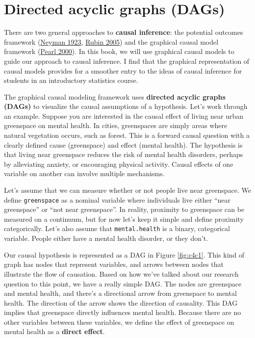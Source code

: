 \documentclass[
]{book}
\begin{document}
\section{Directed acyclic graphs (DAGs)}\label{directed-acyclic-graphs-dags}

There are two general approaches to \textbf{causal inference}: the potential outcomes framework (\href{https://www.jstor.org/stable/2245382}{Neyman 1923}, \href{https://www.jstor.org/stable/27590541}{Rubin 2005}) and the graphical causal model framework (\href{https://bayes.cs.ucla.edu/BOOK-2K/}{Pearl 2000}). In this book, we will use graphical causal models to guide our approach to causal inference. I find that the graphical representation of causal models provides for a smoother entry to the ideas of causal inference for students in an introductory statistics course.

The graphical causal modeling framework uses \textbf{directed acyclic graphs (DAGs)} to visualize the causal assumptions of a hypothesis. Let's work through an example. Suppose you are interested in the causal effect of living near urban greenspace on mental health. In cities, greenspaces are simply areas where natural vegetation occurs, such as forest. This is a forward causal question with a clearly defined cause (greenspace) and effect (mental health). The hypothesis is that living near greenspace reduces the risk of mental health disorders, perhaps by alleviating anxiety, or encouraging physical activity. Causal effects of one variable on another can involve multiple mechanisms.

Let's assume that we can measure whether or not people live near greenspace. We define \texttt{greenspace} as a nominal variable where individuals live either ``near greenspace'' or ``not near greenspace''. In reality, proximity to greenspace can be measured on a continuum, but for now let's keep it simple and define proximity categorically. Let's also assume that \texttt{mental.health} is a binary, categorical variable. People either have a mental health disorder, or they don't.

Our causal hypothesis is represented as a DAG in Figure \ref{fig:c4c1}. This kind of graph has nodes that represent variables, and arrows between nodes that illustrate the flow of causation. Based on how we've talked about our research question to this point, we have a really simple DAG. The nodes are greenspace and mental health, and there's a directional arrow from greenspace to mental health. The direction of the arrow shows the direction of causality. This DAG implies that greenspace directly influences mental health. Because there are no other variables between these variables, we define the effect of greenspace on mental health as a \textbf{direct effect}.
\end{document}
